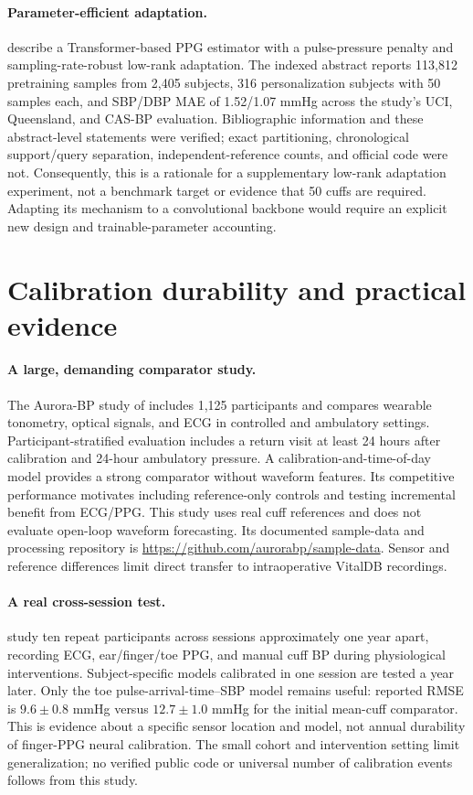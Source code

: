 \documentclass[11pt]{article}
\begin{document}
\paragraph{Parameter-efficient adaptation.}
\citet{li2026} describe a Transformer-based PPG estimator with a pulse-pressure penalty and sampling-rate-robust low-rank adaptation. The indexed abstract reports 113,812 pretraining samples from 2,405 subjects, 316 personalization subjects with 50 samples each, and SBP/DBP MAE of 1.52/1.07 mmHg across the study's UCI, Queensland, and CAS-BP evaluation. Bibliographic information and these abstract-level statements were verified; exact partitioning, chronological support/query separation, independent-reference counts, and official code were not. Consequently, this is a rationale for a supplementary low-rank adaptation experiment, not a benchmark target or evidence that 50 cuffs are required. Adapting its mechanism to a convolutional backbone would require an explicit new design and trainable-parameter accounting.

\section{Calibration durability and practical evidence}
\paragraph{A large, demanding comparator study.}
The Aurora-BP study of \citet{mieloszyk2022} includes 1,125 participants and compares wearable tonometry, optical signals, and ECG in controlled and ambulatory settings. Participant-stratified evaluation includes a return visit at least 24 hours after calibration and 24-hour ambulatory pressure. A calibration-and-time-of-day model provides a strong comparator without waveform features. Its competitive performance motivates including reference-only controls and testing incremental benefit from ECG/PPG. This study uses real cuff references and does not evaluate open-loop waveform forecasting. Its documented sample-data and processing repository is \url{https://github.com/aurorabp/sample-data}. Sensor and reference differences limit direct transfer to intraoperative VitalDB recordings.

\paragraph{A real cross-session test.}
\citet{yavarimanesh2022} study ten repeat participants across sessions approximately one year apart, recording ECG, ear/finger/toe PPG, and manual cuff BP during physiological interventions. Subject-specific models calibrated in one session are tested a year later. Only the toe pulse-arrival-time--SBP model remains useful: reported RMSE is $9.6\pm0.8$ mmHg versus $12.7\pm1.0$ mmHg for the initial mean-cuff comparator. This is evidence about a specific sensor location and model, not annual durability of finger-PPG neural calibration. The small cohort and intervention setting limit generalization; no verified public code or universal number of calibration events follows from this study.
\end{document}
